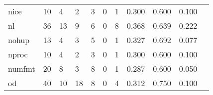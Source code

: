 \begin{longtable}{lp{1.2cm}p{1.2cm}p{1.2cm}p{1.2cm}p{1.2cm}p{1.2cm}p{1.2cm}p{1.2cm}p{1.2cm}p{1.2cm}}
nice      &                                    10 &                                                  4 &                                                  2 &                                                  3 &                                                  0 &                                                  1 &                                         0.300 &                                              0.600 &                                              0.100 \\
nl        &                                    36 &                                                 13 &                                                  9 &                                                  6 &                                                  0 &                                                  8 &                                         0.368 &                                              0.639 &                                              0.222 \\
nohup     &                                    13 &                                                  4 &                                                  3 &                                                  5 &                                                  0 &                                                  1 &                                         0.327 &                                              0.692 &                                              0.077 \\
nproc     &                                    10 &                                                  4 &                                                  2 &                                                  3 &                                                  0 &                                                  1 &                                         0.300 &                                              0.600 &                                              0.100 \\
numfmt    &                                    20 &                                                  8 &                                                  3 &                                                  8 &                                                  0 &                                                  1 &                                         0.287 &                                              0.600 &                                              0.050 \\
od        &                                    40 &                                                 10 &                                                 18 &                                                  8 &                                                  0 &                                                  4 &                                         0.312 &                                              0.750 &                                              0.100 \\

\end{longtable}
